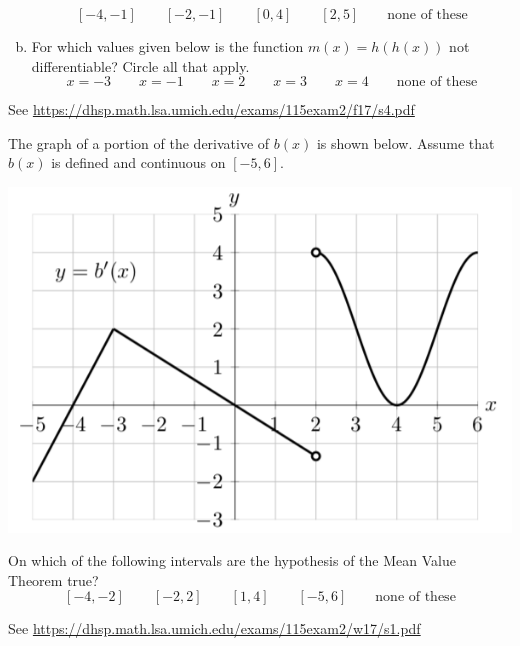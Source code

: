 \documentclass[11pt]{exam}
\begin{document}
\begin{questions}
\begin{enumerate}[(a)]
	$$[-4,-1] \qquad [-2,-1] \qquad [0,4] \qquad [2,5] \qquad \textrm{none of these}$$
	\item For which values given below is the function $m(x) = h(h(x))$ not differentiable?
  Circle all that apply.
  $$x=-3 \qquad x=-1 \qquad x=2 \qquad x=3 \qquad x=4 \qquad \textrm{none of these}$$
	\end{enumerate}
        \begin{solution}
          See \href{https://dhsp.math.lsa.umich.edu/exams/115exam2/f17/s4.pdf}{https://dhsp.math.lsa.umich.edu/exams/115exam2/f17/s4.pdf}
        \end{solution}
\question The graph of a portion of the derivative of $b(x)$ is shown below. Assume that $b(x)$ is defined and continuous on $[-5, 6]$.
\begin{center}
  \includegraphics[scale=0.4]{Figures/Winter2017Exam2Problem1}
\end{center}
On which of the following intervals are the hypothesis of the Mean Value Theorem true?
		$$[-4,-2] \qquad [-2,2] \qquad [1,4] \qquad [-5,6] \qquad \textrm{none of these}$$
                \begin{solution}
                 See \href{https://dhsp.math.lsa.umich.edu/exams/115exam2/w17/s1.pdf}{https://dhsp.math.lsa.umich.edu/exams/115exam2/w17/s1.pdf}  
                \end{solution}

\end{questions}
\end{document}
